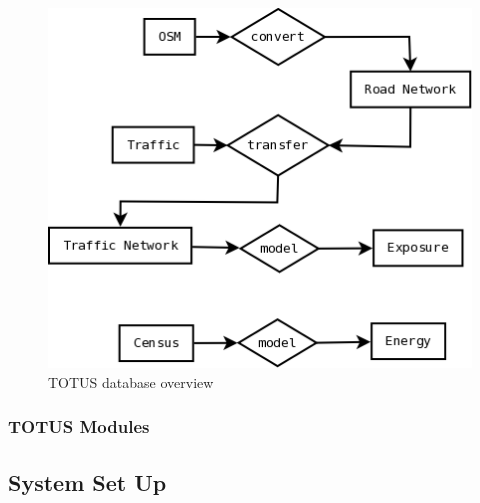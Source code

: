 \begin{figure}
	\caption{TOTUS database overview}
	\label{fig:db_diag}
	\includegraphics[width = 12cm]{system_data.png}
\end{figure}

\subsubsection*{TOTUS Modules}

\subsection*{System Set Up}

